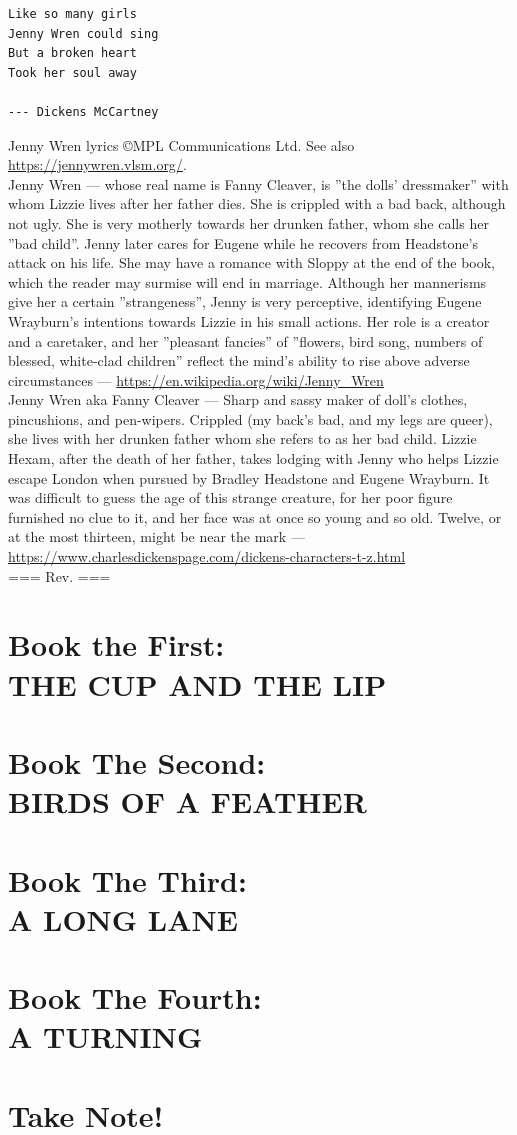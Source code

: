 \documentclass[12pt]{book}
\begin{document}
\begin{verbatim}
Like so many girls
Jenny Wren could sing
But a broken heart
Took her soul away

--- Dickens McCartney
\end{verbatim}

\noindent
Jenny Wren lyrics \copyright MPL Communications Ltd. See also \url{https://jennywren.vlsm.org/}.
\\[1pt]

\noindent
Jenny Wren --- whose real name is Fanny Cleaver,
is ''the dolls' dressmaker'' with whom Lizzie lives after her father dies.
She is crippled with a bad back, although not ugly.
She is very motherly towards her drunken father, whom she calls her ''bad child''.
Jenny later cares for Eugene while he recovers from Headstone's attack on his life.
She may have a romance with Sloppy at the end of the book,
which the reader may surmise will end in marriage.
Although her mannerisms give her a certain ''strangeness'', Jenny is very perceptive,
identifying Eugene Wrayburn's intentions towards Lizzie in his small actions.
Her role is a creator and a caretaker, 
and her ''pleasant fancies'' of ''flowers, bird song, numbers of blessed, 
white-clad children'' reflect the mind's ability to rise above adverse 
circumstances --- \url{https://en.wikipedia.org/wiki/Jenny_Wren}
\\[1pt]

\noindent
Jenny Wren aka Fanny Cleaver --- Sharp and sassy maker of doll's clothes, 
pincushions, and pen-wipers. 
Crippled (my back’s bad, and my legs are queer),
she lives with her drunken father whom she refers to as her bad child.
Lizzie Hexam, after the death of her father,
takes lodging with Jenny who helps Lizzie escape London when pursued by Bradley Headstone and Eugene Wrayburn.
It was difficult to guess the age of this strange creature,
for her poor figure furnished no clue to it,
and her face was at once so young and so old. Twelve,
or at the most thirteen, might be near the mark --- 
\url{https://www.charlesdickenspage.com/dickens-characters-t-z.html}
\\[1pt]

\noindent
=== Rev. \rev ===

\newpage


\part{Book the First:\\THE CUP AND THE LIP}

\part{Book The Second:\\BIRDS OF A FEATHER}

\part{Book The Third:\\A LONG LANE}

\part{Book The Fourth:\\A TURNING}

\part{Take Note!}


\end{document}
